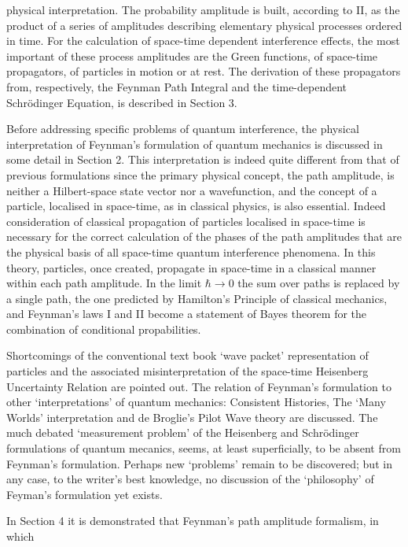 {  physical interpretation. The probability amplitude is built, according to
  II, as the product of a series of amplitudes describing elementary physical 
   processes ordered in time. For the calculation of space-time dependent
  interference effects, the most important of these process amplitudes are the
  Green functions, of space-time propagators, of particles in motion or at rest.
  The derivation of these propagators from, respectively, the Feynman Path Integral
 and the time-dependent Schr\"{o}dinger Equation, is described in Section 3.
  \par Before addressing specific problems of quantum interference, the physical
  interpretation of Feynman's formulation of quantum mechanics is discussed in
  some detail in Section 2. This interpretation is indeed quite different from
  that of previous formulations since the primary physical concept,
  the path amplitude, is neither a Hilbert-space state vector nor 
  a wavefunction, and the concept of a particle, localised in space-time,
  as in classical physics, is also essential. Indeed consideration of classical 
  propagation of particles localised in space-time is necessary for the correct
  calculation of the phases of the path amplitudes that are the physical 
  basis of all space-time quantum interference phenomena. In this theory, particles,
  once created, propagate in space-time in a classical manner within each path
  amplitude. In the limit 
  $\hbar \rightarrow 0$ the sum over paths is replaced by a single path, the one
  predicted by Hamilton's Principle of classical mechanics,
   and Feynman's laws I and II become a statement
  of Bayes theorem for the combination of conditional propabilities. 
  \par Shortcomings
  of the conventional text book `wave packet' representation of particles and the associated
  misinterpretation of the space-time Heisenberg Uncertainty Relation are pointed out.
  The relation of Feynman's formulation to other `interpretations' of quantum mechanics:
  Consistent Histories, The `Many Worlds' interpretation and de Broglie's Pilot
  Wave theory are discussed. The much debated `measurement problem' of the
  Heisenberg and Schr\"{o}dinger formulations of quantum mecanics, seems, at least superficially, to be
  absent from Feynman's formulation. Perhaps new `problems' remain to be discovered; but in any case,
   to the writer's best knowledge, no
  discussion of the `philosophy' of Feyman's formulation  yet exists.
  \par In Section 4 it is demonstrated that Feynman's path amplitude formalism, in which
}
